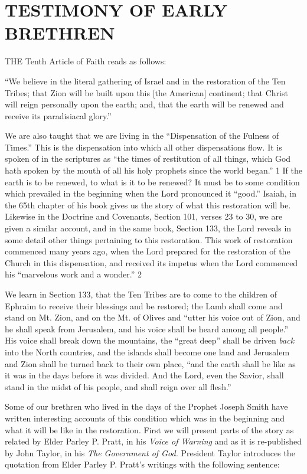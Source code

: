 \chapter{TESTIMONY OF EARLY BRETHREN}

THE Tenth Article of Faith reads as follows:

``We believe in the literal gathering of Israel and in the restoration of the Ten Tribes; that
Zion will be built upon this [the American] continent; that Christ will reign personally upon
the earth; and, that the earth will be renewed and receive its paradisiacal glory.''

We are also taught that we are living in the ``Dispensation of the Fulness of Times.'' This is
the dispensation into which all other dispensations flow. It is spoken of in the scriptures as
``the times of restitution of all things, which God hath spoken by the mouth of all his holy
prophets since the world began.'' 1 If the earth is to be renewed, to what is it to be renewed?
It must be to some condition which prevailed in the beginning when the Lord pronounced it
``good.'' Isaiah, in the 65th chapter of his book gives us the story of what this restoration will
be. Likewise in the Doctrine and Covenants, Section 101, verses 23 to 30, we are given a
similar account, and in the same book, Section 133, the Lord reveals in some detail other
things pertaining to this restoration. This work of restoration commenced many years ago,
when the Lord prepared for the restoration of the Church in this dispensation, and received its
impetus when the Lord commenced his ``marvelous work and a wonder.'' 2

We learn in Section 133, that the Ten Tribes are to come to the children of Ephraim to
receive their blessings and be restored; the Lamb shall come and stand on Mt. Zion, and on
the Mt. of Olives and ``utter his voice out of Zion, and he shall speak from Jerusalem, and his
voice shall be heard among all people.'' His voice shall break down the mountains, the ``great
deep'' shall be driven \textit{back} into the North countries, and the islands shall become one land
and Jerusalem and Zion shall be turned back to their own place, ``and the earth shall be like as
it was in the days before it was divided. And the Lord, even the Savior, shall stand in the
midst of his people, and shall reign over all flesh.''

Some of our brethren who lived in the days of the Prophet Joseph Smith have written
interesting accounts of this condition which was in the beginning and what it will be like in
the restoration. First we will present parts of the story as related by Elder Parley P. Pratt, in
his \textit{Voice of Warning} and as it is re-published by John Taylor, in his \textit{The Government of God.}
President Taylor introduces the quotation from Elder Parley P. Pratt's writings with the
following sentence:

